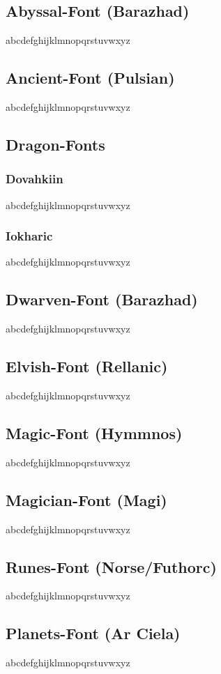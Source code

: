 \documentclass[letterpaper,openany,twoside,twocolumn]{book}
\begin{document}
	\subsection{Abyssal-Font (Barazhad)}
	{\abyssalfont abcdefghijklmnopqrstuvwxyz}
	
	\subsection{Ancient-Font (Pulsian)}
	{\ancientfont abcdefghijklmnopqrstuvwxyz}
	
	\subsection{Dragon-Fonts}
	\subsubsection{Dovahkiin}
	{\dovahkiinfont abcdefghijklmnopqrstuvwxyz}
	\subsubsection{Iokharic}
	{\draconicfont abcdefghijklmnopqrstuvwxyz}
	
	\subsection{Dwarven-Font (Barazhad)}
	{\dwarvenfont abcdefghijklmnopqrstuvwxyz}
	
	\subsection{Elvish-Font (Rellanic)}
	{\elvishfont abcdefghijklmnopqrstuvwxyz}
	
	\subsection{Magic-Font (Hymmnos)}
	{\magicfont abcdefghijklmnopqrstuvwxyz}
	
	\subsection{Magician-Font (Magi)}
	{\magicianfont abcdefghijklmnopqrstuvwxyz}
	
	\subsection{Runes-Font (Norse/Futhorc)}
	{\runesfont abcdefghijklmnopqrstuvwxyz}
	
	\subsection{Planets-Font (Ar Ciela)}
	{\planetsfont abcdefghijklmnopqrstuvwxyz}
\end{document}
